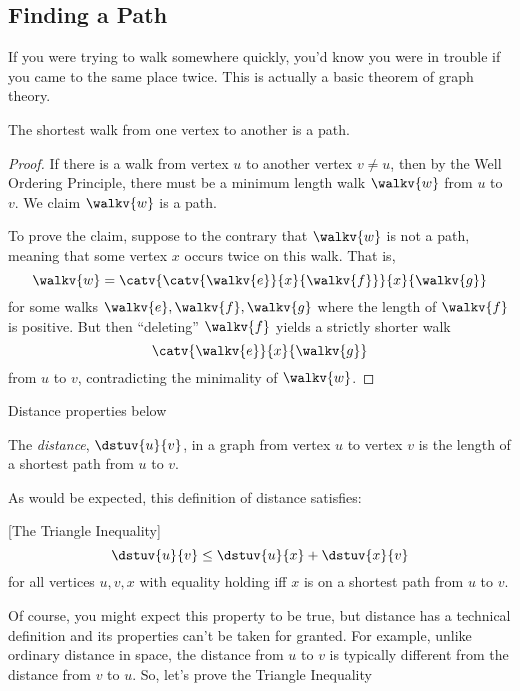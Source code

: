 \subsection{Finding a Path}
If you were trying to walk somewhere quickly, you'd know you were in
trouble if you came to the same place twice.  This is actually a basic
theorem of graph theory.

\begin{theorem}\label{shortestwalk_thm}
The shortest walk from one vertex to another is a path.
\end{theorem}

\begin{proof}
  If there is a walk from vertex $u$ to another vertex $v \neq u$,
  then by the Well Ordering Principle, there must be a minimum length
  walk $\walkv{w}$ from $u$ to~$v$.  We claim $\walkv{w}$ is a path.

  To prove the claim, suppose to the contrary that $\walkv{w}$ is not a
  path, meaning that some vertex $x$ occurs twice on this walk.  That is,
\[
\walkv{w} = \catv{\catv{\walkv{e}}{x}{\walkv{f}}}{x}{\walkv{g}}
\]
for some walks $\walkv{e}, \walkv{f}, \walkv{g}$ where the length of
$\walkv{f}$ is positive.  But then ``deleting'' $\walkv{f}$ yields a
strictly shorter walk
\[
\catv{\walkv{e}}{x}{\walkv{g}}
\]
from $u$ to $v$, contradicting the minimality of $\walkv{w}$.
\end{proof}

\iffalse

Actually, we proved something stronger:
\begin{corollary}\label{pathlewalk_cor}
For any walk in a digraph, there is a path starting and ending at the
same vertices as the walk and containing only edges in the walk.  Such
a path is necessarily no longer than the walk.
\end{corollary}
\fi

\begin{editingnotes}
Distance properties below 
\end{editingnotes}

\begin{definition}
  The \emph{distance},
  $\dstuv{u}{v}$, in a graph from vertex $u$ to vertex $v$ is the
  length of a shortest path from $u$ to $v$.
\end{definition}

As would be expected, this definition of distance satisfies:
\begin{lemma}\label{lem:tri-ineq} [The Triangle Inequality]
\[
\dstuv{u}{v} \leq \dstuv{u}{x} + \dstuv{x}{v}
\]
for all vertices $u,v,x$ with equality holding iff $x$ is on a shortest
path from $u$ to $v$.
\end{lemma}
Of course, you might expect this property to be true, but distance has a
technical definition and its properties can't be taken for granted.
For example, unlike ordinary distance in space, the distance from $u$
to $v$ is typically different from the distance from $v$ to $u$.
So, let's prove the Triangle Inequality

